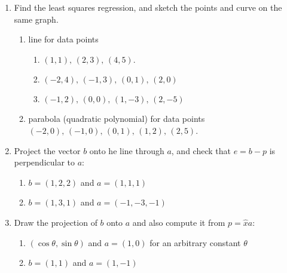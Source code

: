 \documentclass[14pt]{amsart}
\begin{document}
\begin{enumerate}
\begin{enumerate}
\end{enumerate}

\item  Find the least squares regression, and sketch the points and curve on the same graph.

\begin{enumerate}

\item   line for data points 

\begin{enumerate}

\item  $(1,1),\, (2,3),\, (4,5)$.

\item  $(-2, 4),\, (-1, 3),\, (0, 1),\, (2, 0)$

\item  $(-1, 2),\, (0, 0),\, (1, -3),\, (2, -5)$

\end{enumerate}

\item  parabola (quadratic polynomial) for data points $(-2, 0),\, (-1,0),\, (0,1),\, (1,2),\, (2,5)$.

\end{enumerate}

\item  Project the vector $b$ onto he line through $a$, and check that $e = b-p$ is perpendicular to $a$:

\begin{enumerate}

\item  $b = (1, 2, 2)$ and $a = (1, 1, 1)$

\item  $b = (1, 3, 1)$ and $a = (-1, -3, -1)$

\end{enumerate}

\item  Draw the projection of $b$ onto $a$ and also compute it from $p = \hat{x}a$:

\begin{enumerate}

\item  $(\cos\theta, \sin\theta)$ and $a = (1, 0)$ for an arbitrary constant $\theta$

\item  $b = (1, 1)$ and $a = (1, -1)$

\end{enumerate}


\end{enumerate}
\end{document}
